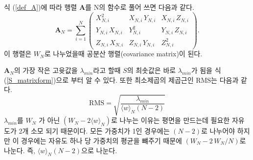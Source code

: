 \documentclass[chapter,a4paper,10pt]{oblivoir}
\begin{document}
식 (\ref{def_A})에 따라 행렬 $\mathbf{A}$를 N의 함수로 풀어 쓰면 다음과 같다.
\begin{equation} \label{matrix_A}
\mathbf{A}_N = \sum_{i=1}^N\left( \begin{array}{ccc}
  X_{N,i}^2 & X_{N,i}\,Y_{N,i} & X_{N,i}\,Z_{N,i} \\
  Y_{N,i}\,X_{N,i} & Y_{N,i}^2 & Y_{N,i}\,Z_{N,i} \\
  Z_{N,i}\,X_{N,i} & Z_{N,i}\,Y_{N,i} & Z_{N,i}^2
\end{array} \right).
\end{equation}
이 행렬은 $W_N$로 나누었을때 공분산 행렬(covariance matrix)이 된다.

$\mathbf{A}_N$의 가장 작은 고윳값을 $\lambda _{min}$라고 할때 $S$의 최솟값은 
바로 $\lambda _{min}$가 됨을 식 (\ref{S_matrixform})으로 부터 알 수 있다.
또한 최소제곱의 제곱근인 RMS는 다음과 같다.
\begin{equation}
\mathrm{RMS} = \sqrt{\frac{\lambda_{min}}
{\langle w\rangle_N (N-2)}}
\end{equation}
$\lambda _{min}$를 $W_N$ 가 아닌 $(W_N - 2\langle w\rangle_N)$로 나누는 
이유는 평면을 만드는데 필요한 자유도가 2개 소모 되기 때문이다. 
모든 가중치가 1인 경우에는 $(N-2)$로 나누어야 하지만 이 경우에는
자유도 하나 당 가중치의 평균을 뺴주기 때문에 
$(W_N - 2\,W_N/N)$로 나눈다.  즉, $\langle w\rangle_N (N-2)$으로 나눈다.
\end{document}
